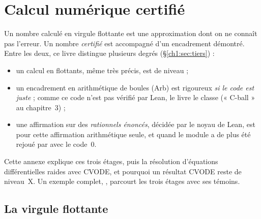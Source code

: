 \ifdefined\chemin\else
{}
\DeclareUrlCommand{}
\DeclareUrlCommand{}
\fi
\chapter{Calcul numérique certifié}\label{appD:chap}

Un nombre calculé en virgule flottante est une approximation dont on ne connaît pas l'erreur. Un nombre
\emph{certifié} est accompagné d'un encadrement démontré. Entre les deux, ce livre distingue plusieurs degrés
(§\ref{ch1:sec:tiers}) :
\begin{itemize}
\item un calcul en flottants, même très précis, est de niveau \tierX{} ;
\item un encadrement en arithmétique de boules (Arb) est rigoureux \emph{si le code est juste} ; comme ce code n'est pas
vérifié par Lean, le livre le classe \tierC{} (« C-ball » au chapitre~3) ;
\item une affirmation sur des \emph{rationnels énoncés}, décidée par le noyau de Lean, est \tierAs{} pour cette
affirmation arithmétique seule, et \tierA{} quand le module a de plus été rejoué par  avec le code~$0$.
\end{itemize}
Cette annexe explique ces trois étages, puis la résolution d'équations différentielles raides avec CVODE, et pourquoi
un résultat CVODE reste de niveau~X. Un exemple complet, , parcourt les trois étages avec
ses témoins.

\section{La virgule flottante}\label{appD:sec:flottant}

